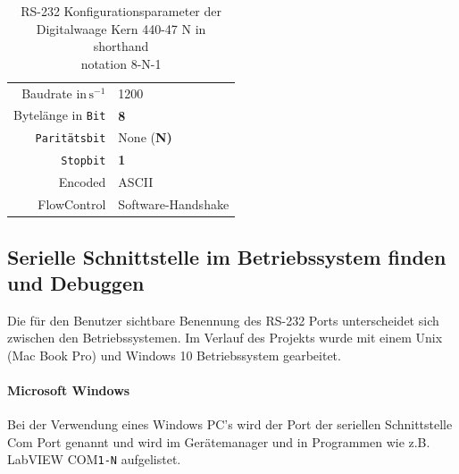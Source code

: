 \begin{table}[h] %
\caption{RS-232 Konfigurationsparameter der Digitalwaage Kern 440-47 N in shorthand \\ notation 8-N-1}
\begin{center}
\begin{tabular}{r|l}
\onehalfspacing
Baudrate in\,$\mathrm{s}^{-1}$ \hspace{6pt} & \hspace{6pt} 1200 \\
Bytelänge in \texttt{Bit} \hspace{6pt} & \hspace{6pt} \textbf{8}  \\
\texttt{Paritätsbit} \hspace{6pt} & \hspace{6pt} None (\textbf{N)} \\
\texttt{Stopbit} \hspace{6pt} & \hspace{6pt} \textbf{1} \\
Encoded \hspace{6pt} & \hspace{6pt} ASCII \\
FlowControl \hspace{6pt} & \hspace{6pt} Software-Handshake \\
\end{tabular}
\end{center}
\label{tab:kern440}
\end{table}

\subsection{Serielle Schnittstelle im Betriebssystem finden und Debuggen} 

Die für den Benutzer sichtbare Benennung des RS-232 Ports unterscheidet sich zwischen den Betriebssystemen. Im Verlauf des Projekts wurde mit einem Unix (Mac Book Pro) und Windows 10 Betriebssystem gearbeitet. 

\paragraph{Microsoft Windows} Bei der Verwendung eines Windows PC's wird der Port der seriellen Schnittstelle Com Port genannt und wird im Gerätemanager und in Programmen wie z.B. LabVIEW COM\texttt{1-N} aufgelistet. 

